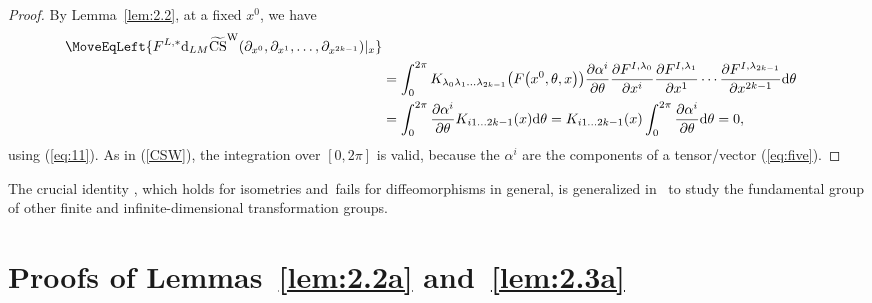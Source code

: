 \documentclass[10pt,a4paper]{amsart}
\numberwithin{equation}{section}
\theoremstyle{definition}
\newcommand{\bm}{ M}
\newcommand{\ocs}{\widetilde{{\rm CS}}}
\begin{document}
\begin{proof}
 By Lemma~\ref{lem:2.2}, at a fixed $x^0$, we have
 \begin{align*}
 \MoveEqLeft{ F^{L,*} {\rm d}_{L{\bm}} \ocs^{\rm W} (\partial_{x^0}, \partial_{x^1},\dots, \partial_{x^{2k-1}})|_{x} }\\
 &=
 \int_0^{2\pi} K_{\lambda_0 \lambda_1\dots\lambda_{2k-1}}\bigl(F\bigl(x^0,\theta,x\bigr)\bigr)
\frac{\partial \alpha^i}{\partial\theta} \frac{\partial F^{I,\lambda_0}}{\partial x^i}
\frac{\partial F^{I,\lambda_1}}{\partial x^1}
\cdots
\frac{\partial F^{I,\lambda_{2k-1}}}{\partial x^{2k-1}}
 {\rm d}\theta\\
 &=\int_0^{2\pi}\frac{\partial \alpha^i}{\partial\theta} K_{i1\dots 2k-1}(x) {\rm d}\theta
 = K_{i1\dots 2k-1}(x)\int_0^{2\pi}\frac{\partial \alpha^i}{\partial\theta} {\rm d}\theta=0,
 \end{align*}
 using (\ref{eq:11}).
 As in (\ref{CSW}), the integration over $[0, 2\pi]$ is valid, because the $\alpha^i$ are the components of a tensor/vector (\ref{eq:five}).
\end{proof}

The crucial identity , which holds for isometries and~fails for diffeomorphisms in general, is generalized in~\cite{MRTVI} to study the fundamental group of other finite and infinite-dimensional transformation groups.

\section{Proofs of Lemmas~\ref{lem:2.2a} and~\ref{lem:2.3a}}\label{app:B}
\end{document}
